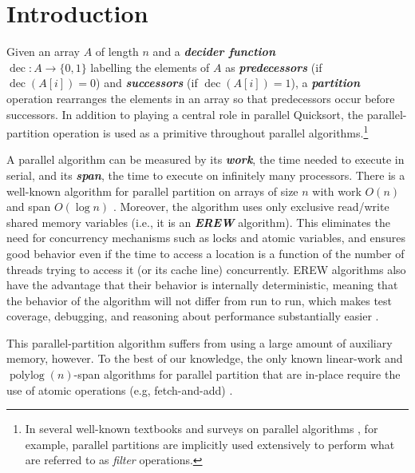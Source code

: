 \documentclass[sigconf]{acmart}
\newcommand{\dec}{\operatorname{dec}}
\newcommand{\defn}[1]{{\textit{\textbf{\boldmath #1}}}}
\theoremstyle{remark}
\theoremstyle{remark}
\begin{document}


\maketitle
\section{Introduction}

Given an array $A$ of length $n$ and a \defn{decider function} \\$\dec: A \to \{0, 1\}$
labelling the elements of $A$ as \defn{predecessors} (if $\dec(A[i])=0$) and
\defn{successors} (if $\dec(A[i])=1$), a \defn{partition} operation rearranges the
elements in an array so that predecessors occur before successors. In addition
to playing a central role in parallel Quicksort, the parallel-partition
operation is used as a primitive throughout parallel algorithms.\footnote{In
  several well-known textbooks and surveys on parallel algorithms
\cite{AcarBl16,Blelloch96}, for example, parallel partitions are implicitly
used extensively to perform what are referred to as \emph{filter} operations.}

A parallel algorithm can be measured by its \defn{work}, the time
needed to execute in serial, and its \defn{span}, the time to execute
on infinitely many processors. There is a well-known algorithm for
parallel partition on arrays of size $n$ with work $O(n)$ and span
$O(\log n)$ \cite{Blelloch96,AcarBl16}. Moreover, the algorithm uses
only exclusive read/write shared memory variables (i.e., it is an
\defn{EREW} algorithm). This eliminates the need for concurrency
mechanisms such as locks and atomic variables, and ensures good
behavior even if the time to access a location is a function of the
number of threads trying to access it (or its cache line)
concurrently. EREW algorithms also have the advantage that their
behavior is internally deterministic, meaning that
the behavior of the algorithm will not differ from run to run, which
makes test coverage, debugging, and reasoning about performance
substantially easier \cite{BlellochFi12}.

This parallel-partition algorithm suffers from using a large amount of
auxiliary memory, however. To the best of our knowledge, the only
known linear-work and $\operatorname{polylog}(n)$-span algorithms for
parallel partition that are in-place require the use of atomic
operations (e.g, fetch-and-add)
\cite{HeidelbergerNo90,AxtmannWi17,TsigasZh03}.
\end{document}

